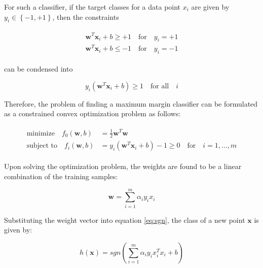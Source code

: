 For such a classifier, if the target classes for a data point $x_i$ are given by $y_i \in \left\lbrace -1, +1 \right\rbrace$, then the constraints

\begin{align}
\begin{aligned}
\mathbf{w}^{T}\mathbf{x}_i + b \geq +1 \quad \text{for} \quad y_i = +1 \\
\mathbf{w}^{T}\mathbf{x}_i + b \leq -1 \quad \text{for} \quad y_i = -1
\end{aligned}
\end{align}

can be condensed into

$$
y_i (\mathbf{w}^{T}\mathbf{x}_i + b) \geq 1 \quad \text{for all} \quad i
$$

Therefore, the problem of finding a maximum margin classifier can be formulated as a constrained convex optimization problem as follows:

\begin{align}
\begin{aligned}
\text{minimize} \quad f_0(\mathbf{w},b) &= \frac{1}{2} \mathbf{w}^{T} \mathbf{w} \\
\text{subject to} \quad f_i(\mathbf{w},b) &= y_i (\mathbf{w}^{T}\mathbf{x}_i + b) -1 \geq 0 \quad \text{for} \quad i = 1,...,m
\end{aligned}
\end{align}


Upon solving the optimization problem, the weights are found to be a linear combination of the training samples:

$$
\mathbf{w} = \sum^{m}_{i=1} \alpha_i y_i x_i
$$

Substituting the weight vector into equation \ref{eq:sgn}, the class of a new point $\mathbf{x}$ is given by:

$$
h(\mathbf{x}) = sgn(\sum^{m}_{i=1} \alpha_i y_i x_i^{T} x_i + b)
$$

